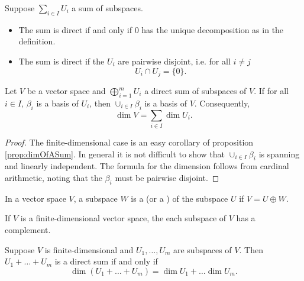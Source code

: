 \begin{proposition} \label{prop:directSumCriterion}
Suppose $\sum_{i\in I}U_i$ a sum of subspaces.
\begin{itemize}
\item The sum is direct \textup{if and only if} $0$ has the unique decomposition as in the definition.
\item The sum is direct if the $U_i$ are pairwise disjoint, i.e. for all $i\neq j$
\[ U_i \cap U_j = \{0\}. \]
\end{itemize}
\end{proposition}

\begin{proposition}
Let $V$ be a vector space and $\bigoplus_{i=1}^m U_i$ a direct sum of subspaces of $V$.
If for all $i\in I$, $\beta_i$ is a basis of $U_i$, then $\cup_{i\in I}\beta_i$ is a basis of $V$. Consequently,
\[ \dim V = \sum_{i\in I} \dim U_i. \]
\end{proposition}
\begin{proof}
The finite-dimensional case is an easy corollary of proposition \ref{prop:dimOfASum}. In general it is not difficult to show that $\cup_{i\in I}\beta_i$ is spanning and linearly independent. The formula for the dimension follows from cardinal arithmetic, noting that the $\beta_i$ must be pairwise disjoint.
\end{proof}

\begin{definition}
In a vector space $V$, a subspace $W$ is a  (or a ) of the subspace $U$ if $V = U \oplus W$.
\end{definition}

\begin{proposition}
If $V$ is a finite-dimensional vector space, the each subspace of $V$ has a complement.
\end{proposition}
\begin{corollary}
Suppose $V$ is finite-dimensional and $U_1,\ldots, U_m$ are subspaces of $V$. Then $U_1+\ldots+ U_m$ is a direct sum \textup{if and only if}
\[ \dim(U_1+\ldots+U_m) = \dim U_1 + \ldots \dim U_m. \]
\label{corollary:directSumDimensionCriterion}
\end{corollary}

